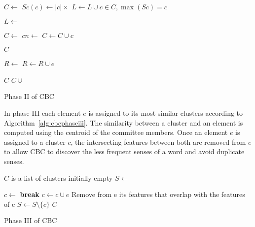 \begin{algorithm}
 \begin{algorithmic}
    \State $C \gets$ 
      \State $Sc(c) \gets |c| \times $ 
    \EndFor
    \State $L \gets L \cup c \in C, \max(Sc) = c$
  \EndFor

  \State $L \gets$ 

  \State $C \gets$ 
    \State $cn \gets$ 
      \State $C \gets C \cup c$
    \EndIf
  \EndFor

    \State \Return $C$
  \EndIf

  \State $R \gets$ 
      \State $R \gets R \cup e$
    \EndIf
  \EndFor

    \State \Return $C$
  \Else
    \State \Return $C \cup$ 
  \EndIf
\EndFunction
 \end{algorithmic}

 \caption{\label{alg:cbcphaseii} Phase II of CBC}
\end{algorithm}


In phase III each element $e$ is assigned to its most similar clusters
according to Algorithm~\ref{alg:cbcphaseiii}. The similarity between a cluster
and an element is computed using the centroid of the committee members. Once an
element $e$ is assigned to a cluster $c$, the intersecting features between
both are removed from $e$ to allow \ac{CBC} to discover the less frequent
senses of a word and avoid duplicate senses.

\begin{algorithm}
 \begin{algorithmic}
  \State $C$ is a list of clusters initially empty
    \State $S \gets$ 

      \State $c \gets$ 
        \State \textbf{break}
      \EndIf
       \State $c \gets c \cup e$
       \State Remove from e its features that overlap with the features of c
     \EndIf
     \State $S \gets S \setminus \{c\}$
    \EndWhile
    \State \Return $C$
  \EndFunction
 \end{algorithmic}

 \caption{\label{alg:cbcphaseiii} Phase III of CBC}
\end{algorithm}

